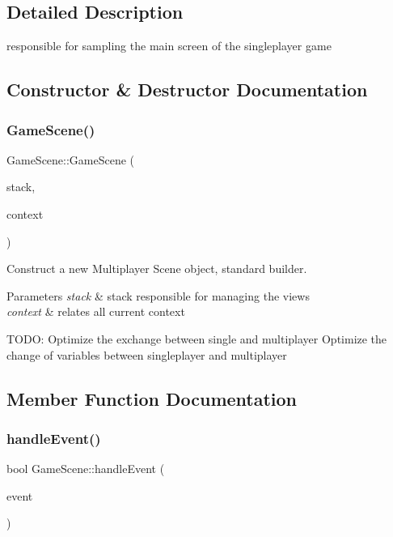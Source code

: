 \subsection{Detailed Description}
responsible for sampling the main screen of the singleplayer game 

\subsection{Constructor \& Destructor Documentation}
\mbox{\label{classGameScene_abc5dab6de1f960181d01c4991c15a3e8}} 
\subsubsection{\texorpdfstring{Game\+Scene()}{GameScene()}}
{\footnotesize\ttfamily Game\+Scene\+::\+Game\+Scene (\begin{DoxyParamCaption}\item[{\hyperlink{classStateManager}{State\+Manager} \&}]{stack,  }\item[{\hyperlink{structState_1_1Context}{Context}}]{context }\end{DoxyParamCaption})}



Construct a new Multiplayer Scene object, standard builder. 


\begin{DoxyParams}{Parameters}
{\em stack} & stack responsible for managing the views \\
\hline
{\em context} & relates all current context \\
\hline
\end{DoxyParams}
T\+O\+DO\+: Optimize the exchange between single and multiplayer Optimize the change of variables between singleplayer and multiplayer

\subsection{Member Function Documentation}
\mbox{\label{classGameScene_aa494372b1f451f3c3a268558fddb30f2}} 
\subsubsection{\texorpdfstring{handle\+Event()}{handleEvent()}}
{\footnotesize\ttfamily bool Game\+Scene\+::handle\+Event (\begin{DoxyParamCaption}\item[{const sf\+::\+Event \&}]{event }\end{DoxyParamCaption})\hspace{0.3cm}{\ttfamily [virtual]}}



